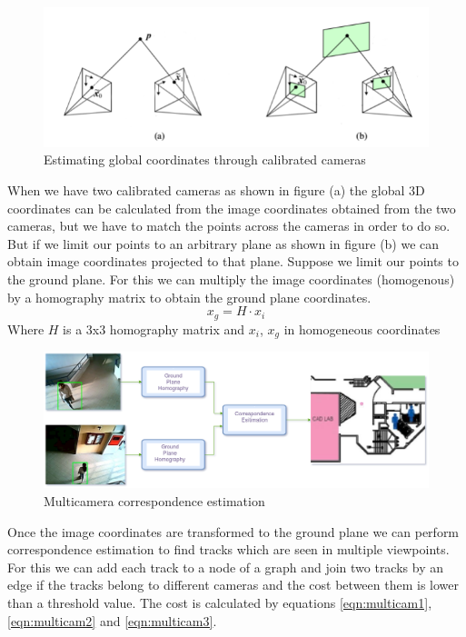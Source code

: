 \documentclass[12pt,a4paper]{report}
\begin{document}
\begin{figure}[H]
\includegraphics[width=\textwidth]{multi_cam.png}
\centering
\caption{Estimating global coordinates through calibrated cameras}
\label{multi_cam}
\end{figure}
When we have two calibrated cameras as shown in figure (a) the global 3D coordinates can be calculated from the image coordinates obtained from the two cameras, but we have to match the points across the cameras in order to do so. But if we limit our points to an arbitrary plane as shown in figure (b) we can obtain image coordinates projected to that plane. Suppose we limit our points to the ground plane. For this we can multiply the image coordinates (homogenous) by a homography matrix to obtain the ground plane coordinates.
\begin{equation}
x_g = H \cdot x_i
\end{equation}
Where $H$ is a 3x3 homography matrix and $x_i$, $x_g$ in homogeneous coordinates
\begin{figure}[H]
\includegraphics[width=\textwidth]{multi_cam_map.png}
\centering
\caption{Multicamera correspondence estimation}
\label{multi_cam_map}
\end{figure}
Once the image coordinates are transformed to the ground plane we can perform correspondence estimation to find tracks which are seen in multiple viewpoints. For this we can add each track to a node of a graph and join two tracks by an edge if the tracks belong to different cameras and the cost between them is lower than a threshold value.  The cost is calculated by equations \ref{eqn:multicam1}, \ref{eqn:multicam2} and \ref{eqn:multicam3}.
\end{document}
